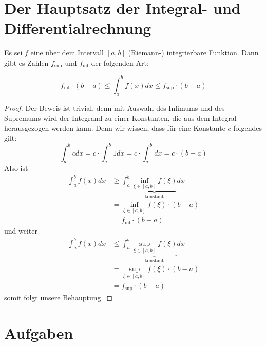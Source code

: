 \section{Der Hauptsatz der Integral- und Differentialrechnung}

\begin{lemma}
Es sei $f$ eine über dem Intervall $[a,b]$ (Riemann-) integrierbare Funktion. Dann gibt es Zahlen $f_{\sup}$ und $f_{\inf}$ der folgenden Art:

\begin{equation}
f_{\inf}\cdot (b-a) \le \int_{a}^{b} f(x) dx \le f_{\sup} \cdot (b-a)
\end{equation}
\end{lemma}
\begin{proof}
Der Beweis ist trivial, denn mit Auswahl des Infimums und des Supremums wird der Integrand zu einer Konstanten, die aus dem Integral herausgezogen werden kann. Denn wir wissen, dass für eine Konstante $c$ folgendes gilt:
\begin{equation}
\int_a^b c dx = c\cdot \int_a^b 1 dx = c\cdot \int_a^b dx = c\cdot(b-a)
\end{equation}
Also ist
\begin{equation}
\begin{split}
\int_a^b f(x)dx &\ge \int_a^b \underbrace{\inf_{\xi \in [a,b] } f(\xi)}_{\text{konstant}} dx \\
 &= \inf_{\xi \in [a,b] } f(\xi) \cdot (b-a) \\
 &= f_{\inf}\cdot (b-a)
\end{split}
\end{equation}
und weiter
\begin{equation}
\begin{split}
\int_a^b f(x)dx &\le \int_a^b \underbrace{\sup_{\xi \in [a,b] } f(\xi)}_{\text{konstant}} dx \\
 &= \sup_{\xi \in [a,b] } f(\xi) \cdot (b-a) \\
 &= f_{\sup}\cdot (b-a)
\end{split}
\end{equation}
somit folgt unsere Behauptung.
\end{proof}

\section{Aufgaben}